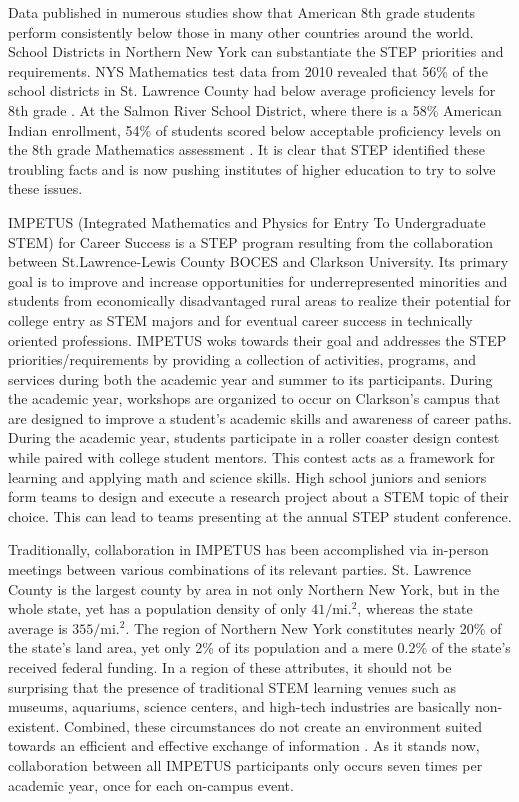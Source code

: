 Data published in numerous studies \cite{timss07, before-its-too-late} show that American 8th grade students perform consistently below those in many other countries around the world. School Districts in Northern New York can substantiate the STEP priorities and requirements. NYS Mathematics test data from 2010 revealed that 56\% of the school districts in St. Lawrence County had below average proficiency levels for 8th grade \cite{nys-test-data-10}. At the Salmon River School District, where there is a 58\% American Indian enrollment, 54\% of students scored below acceptable proficiency levels on the 8th grade Mathematics assessment \cite{nny-prism}. It is clear that STEP identified these troubling facts and is now pushing institutes of higher education to try to solve these issues.

IMPETUS (Integrated Mathematics and Physics for Entry To Undergraduate STEM) for Career Success is a STEP program resulting from the collaboration between St.Lawrence-Lewis County BOCES and Clarkson University. Its primary goal is to improve and increase opportunities for underrepresented minorities and students from economically disadvantaged rural areas to realize their potential for college entry as STEM majors and for eventual career success in technically oriented professions. IMPETUS woks towards their goal and addresses the STEP priorities/requirements by providing a collection of activities, programs, and services during both the academic year and summer to its participants. During the academic year, workshops are organized to occur on Clarkson's campus that are designed to improve a student's academic skills and awareness of career paths. During the academic year, students participate in a roller coaster design contest while paired with college student mentors. This contest acts as a framework for learning and applying math and science skills. High school juniors and seniors form teams to design and execute a research project about a STEM topic of their choice. This can lead to teams presenting at the annual STEP student conference.

Traditionally, collaboration in IMPETUS has been accomplished via in-person meetings between various combinations of its relevant parties. St. Lawrence County is the largest county by area in not only Northern New York, but in the whole state, yet has a population density of only $41/\mathrm{mi.}^2$, whereas the state average is $355/\mathrm{mi.}^2$. The region of Northern New York constitutes nearly 20\% of the state's land area, yet only 2\% of its population and a mere 0.2\% of the state's received federal funding. In a region of these attributes, it should not be surprising that the presence of traditional STEM learning venues such as museums, aquariums, science centers, and high-tech industries are basically non-existent. Combined, these circumstances do not create an environment suited towards an efficient and effective exchange of information \cite{nny-prism}. As it stands now, collaboration between all IMPETUS participants only occurs seven times per academic year, once for each on-campus event.

